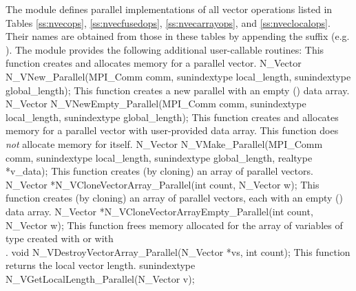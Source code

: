 The {\nvecp} module defines parallel implementations of all vector operations listed
in Tables \ref{ss:nvecops}, \ref{ss:nvecfusedops}, \ref{ss:nvecarrayops},
and \ref{ss:nveclocalops}. Their names
are obtained from those in these tables by appending the suffix 
(e.g. ).
The module {\nvecp} provides the following additional
user-callable routines:
{
  This function creates and allocates memory for a parallel vector.
}
{
  N\_Vector N\_VNew\_Parallel(MPI\_Comm comm, sunindextype
  local\_length,
  sunindextype global\_length);
}
{
  This function creates a new parallel  with an empty
  () data array.
}
{
  N\_Vector N\_VNewEmpty\_Parallel(MPI\_Comm comm, sunindextype
  local\_length,
  sunindextype global\_length);
}
{
  This function creates and allocates memory for a parallel vector
  with user-provided data array. This function does {\em not} allocate memory
  for  itself.
}
{
  N\_Vector N\_VMake\_Parallel(MPI\_Comm comm,
  sunindextype local\_length,
  sunindextype global\_length,
  realtype *v\_data);
}
{
  This function creates (by cloning) an array of  parallel vectors.
}
{
  N\_Vector *N\_VCloneVectorArray\_Parallel(int count, N\_Vector w);
}
{
  This function creates (by cloning) an array of  parallel vectors,
  each with an empty () data array.
}
{
  N\_Vector *N\_VCloneVectorArrayEmpty\_Parallel(int count, N\_Vector w);
}
{
  This function frees memory allocated for the array of   variables of
  type  created with  or with \\
  .
}
{
  void N\_VDestroyVectorArray\_Parallel(N\_Vector *vs, int count);
}
{
  This function returns the local vector length.
}
{
  sunindextype N\_VGetLocalLength\_Parallel(N\_Vector v);
}
